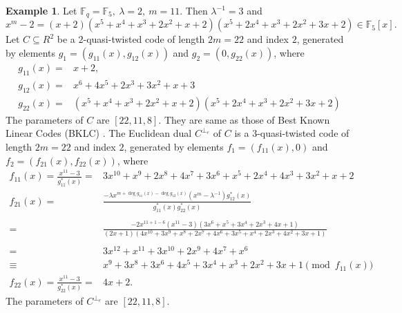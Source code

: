 \documentclass[12 pt]{extarticle}
\numberwithin{equation}{section}
\theoremstyle{definition}
\newtheorem{example}{Example}[section]
\begin{document}
\begin{example}\label{exame}
Let $\mathbb{F}_q=\mathbb{F}_5,\ \lambda=2,\  m=11$. Then $\lambda^{-1}=3$ and $$x^{m}-2=(x + 2)(x^5 + x^4 + x^3 + 2x^2 + x + 2)(x^5 + 2x^4 + x^3 + 2x^2 + 3x + 2)\in \mathbb{F}_5[x].$$  
Let $C\subseteq R^2$ be a $2$-quasi-twisted code of length $2m=22$ and index $2$, generated by elements $g_1=(g_{11}(x),g_{12}(x))$ and $g_2=(0,g_{22}(x))$, where
\begin{equation*}
    \begin{split}
       g_{11}(x)=&x+2,\\
       g_{12}(x)=& x^6 +4x^5 +2x^3 +3x^2 +x+3 \\
       g_{22}(x)=&(x^5 +x^4 +x^3 +2x^2 +x+2)(x^5 +2x^4 +x^3 +2x^2 +3x+2) 
    \end{split}
\end{equation*}
The parameters of $C$ are $[22,11,8]$. They are same as those of Best Known Linear Codes (BKLC) \cite{codetable}. The Euclidean dual $C^{\perp_e}$ of $C$ is a $3$-quasi-twisted code of length $2m=22$ and index $2$, generated by elements $f_1=(f_{11}(x),0)$ and $f_2=(f_{21}(x),f_{22}(x))$, where 
\begin{equation*}
\begin{split}
     f_{11}(x)=\frac{x^{11}-3}{g_{11}^*(x)}=&3x^{10} + x^9 + 2x^8 + 4x^7 + 3x^6 + x^5 + 2x^4 + 4x^3 + 3x^2 + x + 2\\
      f_{21}(x)=&\frac{-\lambda x^{m+\deg g_{11}(x)-\deg g_{12}(x)}(x^m-\lambda^{-1})g^*_{12}(x)}{g^*_{11}(x)g^*_{22}(x)}\\\\
      =&\frac{-2 x^{11+1-6}(x^{11}-3)(3x^6 + x^5 + 3x^4 + 2x^3 + 4x + 1)}{(2x+1)(4x^{10} + 3x^9 + x^8 + 2x^7 + 4x^6 + 3x^5 + x^4 + 2x^3 + 4x^2 + 3x + 1)}\\\\
      =&3x^{12} + x^{11} + 3x^{10} + 2x^9 + 4x^7 + x^6\\
\equiv& x^9 + 3x^8 + 3x^6 + 4x^5 + 3x^4 + x^3 + 2x^2 + 3x + 1 \pmod{f_{11}(x)}\\
f_{22}(x)= \frac{x^{11}-3}{g^*_{22}(x)}=&4x+2.
\end{split}
\end{equation*}
 The parameters of $C^{\perp_e}$ are $[22,11,8]$.
\end{example}
\end{document}
